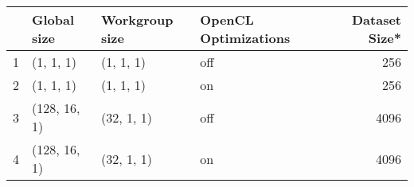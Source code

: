 \begin{tabular}{llllr}
\toprule
{} &   Global size & Workgroup size & OpenCL Optimizations &  Dataset Size* \\
\midrule
1 &     (1, 1, 1) &      (1, 1, 1) &                  off &            256 \\
2 &     (1, 1, 1) &      (1, 1, 1) &                   on &            256 \\
3 &  (128, 16, 1) &     (32, 1, 1) &                  off &           4096 \\
4 &  (128, 16, 1) &     (32, 1, 1) &                   on &           4096 \\
\bottomrule
\end{tabular}
